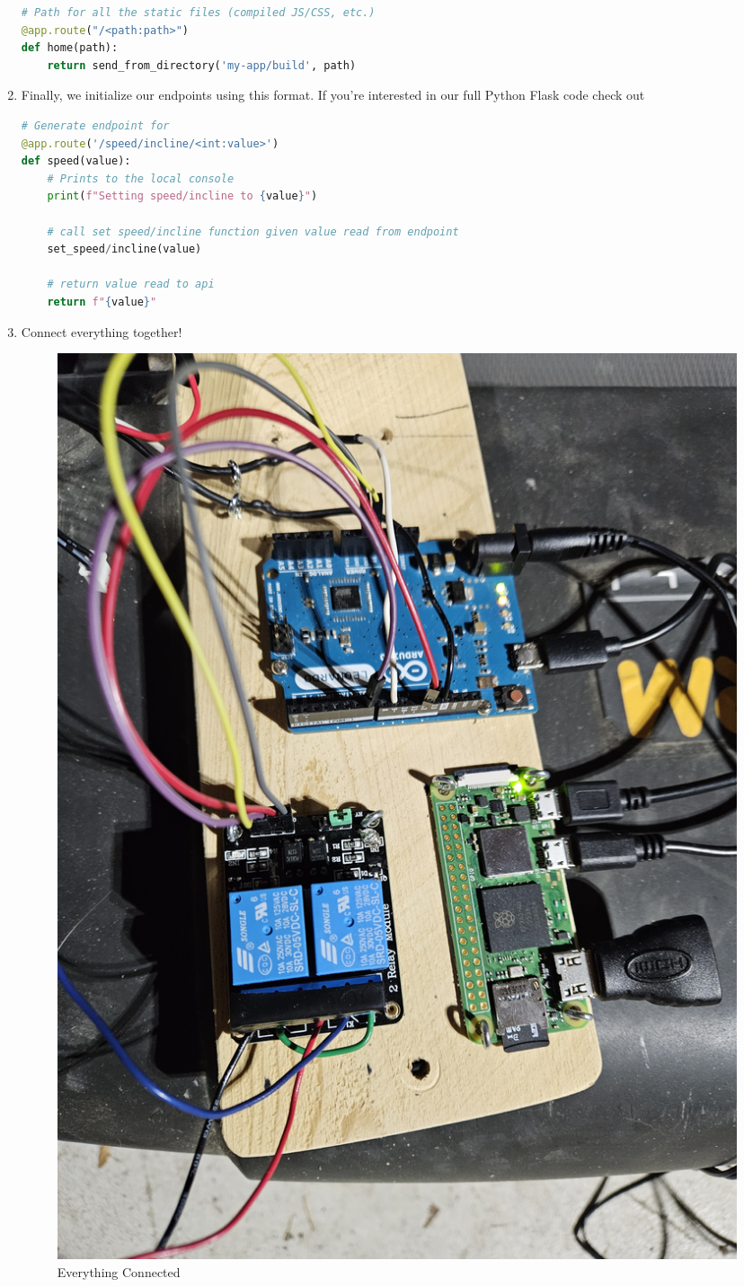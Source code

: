 \documentclass[journal]{IEEEtran}
\newcommand{\MYhref}[3][blue]{\href{#2}{\color{#1}{#3}}}%
\begin{document}
\begin{enumerate}
\begin{lstlisting}[language=Python]
# Path for all the static files (compiled JS/CSS, etc.)
@app.route("/<path:path>")
def home(path):
    return send_from_directory('my-app/build', path)
\end{lstlisting}

\item Finally, we initialize our endpoints using this format. If you're interested in our full Python Flask code check out \MYhref{https://github.com/Leo-Berman/Treadmill-To-Walking-Pad/blob/945cfb8c59715d0fab2927238e48ba3bab0aa0fc/site/webserver.py}{this portion of our GitHub}
\begin{lstlisting}[language=Python]
# Generate endpoint for 
@app.route('/speed/incline/<int:value>')
def speed(value):
    # Prints to the local console 
    print(f"Setting speed/incline to {value}")
    
    # call set speed/incline function given value read from endpoint
    set_speed/incline(value)
    
    # return value read to api
    return f"{value}"
\end{lstlisting}

\item Connect everything together!
    \begin{figure}[H]
            \centering
            \includegraphics[width=0.5\linewidth]{Everything_Wired.jpg}
            \caption{Everything Connected}
            \label{fig:8}
    \end{figure}
\end{enumerate}
\end{document}
